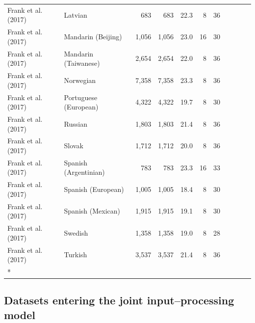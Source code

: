 \documentclass[
  11pt,
]{article}
\begin{document}
\begin{landscape}
\begin{longtable}[t]{llrrrrrclrr}
\hspace{1em}Frank et al. (2017) & Latvian & 683 & 683 & 22.3 & 8 & 36 &  &  &  & \\
\hspace{1em}Frank et al. (2017) & Mandarin (Beijing) & 1,056 & 1,056 & 23.0 & 16 & 30 &  &  &  & \\
\hspace{1em}Frank et al. (2017) & Mandarin (Taiwanese) & 2,654 & 2,654 & 22.0 & 8 & 36 &  &  &  & \\
\hspace{1em}Frank et al. (2017) & Norwegian & 7,358 & 7,358 & 23.3 & 8 & 36 &  &  &  & \\
\hspace{1em}Frank et al. (2017) & Portuguese (European) & 4,322 & 4,322 & 19.7 & 8 & 30 &  &  &  & \\
\hspace{1em}Frank et al. (2017) & Russian & 1,803 & 1,803 & 21.4 & 8 & 36 &  &  &  & \\
\hspace{1em}Frank et al. (2017) & Slovak & 1,712 & 1,712 & 20.0 & 8 & 36 &  &  &  & \\
\hspace{1em}Frank et al. (2017) & Spanish (Argentinian) & 783 & 783 & 23.3 & 16 & 33 &  &  &  & \\
\hspace{1em}Frank et al. (2017) & Spanish (European) & 1,005 & 1,005 & 18.4 & 8 & 30 &  &  &  & \\
\hspace{1em}Frank et al. (2017) & Spanish (Mexican) & 1,915 & 1,915 & 19.1 & 8 & 30 &  &  &  & \\
\hspace{1em}Frank et al. (2017) & Swedish & 1,358 & 1,358 & 19.0 & 8 & 28 &  &  &  & \\
\hspace{1em}Frank et al. (2017) & Turkish & 3,537 & 3,537 & 21.4 & 8 & 36 &  &  &  & \\*

\end{longtable}

\endgroup{}
\end{landscape}

\subsection{Datasets entering the joint input--processing
model}\label{datasets-entering-the-joint-inputprocessing-model}
\end{document}
